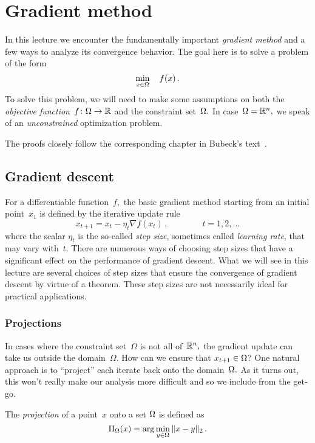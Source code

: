 \section{Gradient method}

In this lecture we encounter the fundamentally important \emph{gradient method}
and a few ways to analyze its convergence behavior.
The goal here is to solve a problem of the form
\[
\min_{x\in\Omega}\quad f(x)\,.
\]
To solve this problem, we will need to make some assumptions on both the 
\emph{objective function}~$f\colon\Omega\to\mathbb{R}$ and the constraint
set~$\Omega.$ In case~$\Omega=\mathbb{R}^n,$ we speak of an \emph{unconstrained}
optimization problem.

The proofs closely follow the
corresponding chapter in Bubeck's text~\cite{Bubeck}.

\subsection{Gradient descent}

For a differentiable function~$f,$ the basic gradient method starting from an
initial point~$x_1$ is defined by the iterative update rule
\[
x_{t+1} = x_t - \eta_t \nabla f(x_t)\,,\qquad\qquad t=1,2,\dots
\]
where the scalar $\eta_t$ is the so-called \emph{step size}, sometimes called
\emph{learning rate}, that may vary with~$t.$ There are numerous ways of
choosing step sizes that have a significant effect on the performance of
gradient descent. What we will see in this lecture are several choices of step
sizes that ensure the convergence of gradient descent by virtue of a theorem.
These step sizes are not necessarily ideal for practical applications.

\subsubsection{Projections}

In cases where the constraint set~$\Omega$ is not all of~$\mathbb{R}^n,$ the gradient
update can take us outside the domain~$\Omega.$ How can we
ensure that $x_{t+1}\in\Omega$?  One natural approach is to ``project'' each
iterate back onto the domain~$\Omega.$ As it turns out, this won't really make
our analysis more difficult and so we include from the get-go.

\begin{definition}[Projection]
The \emph{projection} of a point~$x$ onto a set $\Omega$ is defined as
\[
\Pi_{\Omega}(x) = \arg\min_{y\in\Omega} \|x-y\|_2\,.
\]
\end{definition}

